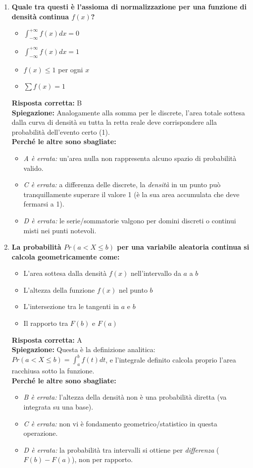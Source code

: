 \documentclass[12pt, a4paper]{article}
\begin{document}
\begin{enumerate}[label=\textbf{\arabic*.}]
    \item \textbf{Quale tra questi è l'assioma di normalizzazione per una funzione di densità continua $f(x)$?}
    \begin{itemize}
        \item[A)] $\int_{-\infty}^{+\infty} f(x) dx = 0$
        \item[B)] $\int_{-\infty}^{+\infty} f(x) dx = 1$
        \item[C)] $f(x) \le 1$ per ogni $x$
        \item[D)] $\sum f(x) = 1$
    \end{itemize}
    \textbf{Risposta corretta:} B \\
    \textbf{Spiegazione:} Analogamente alla somma per le discrete, l'area totale sottesa dalla curva di densità su tutta la retta reale deve corrispondere alla probabilità dell'evento certo (1). \\
    \textbf{Perché le altre sono sbagliate:}
    \begin{itemize}
        \item \textit{A è errata:} un'area nulla non rappresenta alcuno spazio di probabilità valido.
        \item \textit{C è errata:} a differenza delle discrete, la \textit{densità} in un punto può tranquillamente superare il valore 1 (è la sua area accumulata che deve fermarsi a 1).
        \item \textit{D è errata:} le serie/sommatorie valgono per domini discreti o continui misti nei punti notevoli.
    \end{itemize}

    \item \textbf{La probabilità $Pr(a < X \le b)$ per una variabile aleatoria continua si calcola geometricamente come:}
    \begin{itemize}
        \item[A)] L'area sottesa dalla densità $f(x)$ nell'intervallo da $a$ a $b$
        \item[B)] L'altezza della funzione $f(x)$ nel punto $b$
        \item[C)] L'intersezione tra le tangenti in $a$ e $b$
        \item[D)] Il rapporto tra $F(b)$ e $F(a)$
    \end{itemize}
    \textbf{Risposta corretta:} A \\
    \textbf{Spiegazione:} Questa è la definizione analitica: $Pr(a < X \le b) = \int_a^b f(t) dt$, e l'integrale definito calcola proprio l'area racchiusa sotto la funzione. \\
    \textbf{Perché le altre sono sbagliate:}
    \begin{itemize}
        \item \textit{B è errata:} l'altezza della densità non è una probabilità diretta (va integrata su una base).
        \item \textit{C è errata:} non vi è fondamento geometrico/statistico in questa operazione.
        \item \textit{D è errata:} la probabilità tra intervalli si ottiene per \textit{differenza} ($F(b)-F(a)$), non per rapporto.
    \end{itemize}


\end{enumerate}
\end{document}
